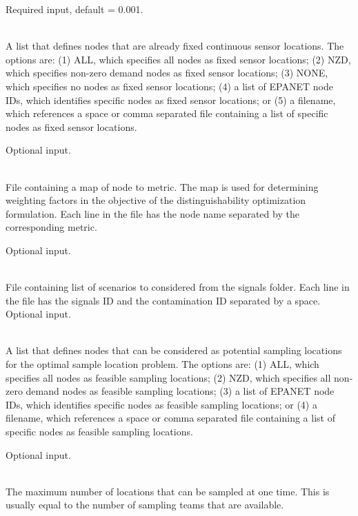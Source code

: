 \begin{description}[topsep=0pt,parsep=0.5em,itemsep=-0.4em]
\begin{description}[topsep=0pt,parsep=0.5em,itemsep=-0.4em]
                Required input, default = 0.001.
    \item[{fixed sensors}]\hfill
\\A list that defines nodes that are already fixed continuous sensor locations.
                The options are: (1) ALL, which specifies all nodes as fixed sensor locations;
                (2) NZD, which specifies non-zero demand nodes as fixed sensor locations;
                (3) NONE, which specifies no nodes as fixed sensor locations;
                (4) a list of EPANET node IDs, which identifies specific nodes as fixed sensor locations; or
                (5) a filename, which references a space or comma separated file containing a list of 
                specific nodes as fixed sensor locations. 

                Optional input.
    \item[{nodes metric}]\hfill
\\ File containing a map of node to metric. The map is used for determining weighting factors
                in the objective of the distinguishability optimization formulation.
                Each line in the file has the node name separated by the corresponding metric.  

                Optional input.
    \item[{list scenario ids}]\hfill
\\ File containing list of scenarios to considered from the signals folder.
                Each line in the file has the signals ID and the contamination ID separated by a space.
                Optional input.
    \item[{feasible nodes}]\hfill
\\A list that defines nodes that can be considered as potential sampling locations 
                for the optimal sample location problem.
                The options are: (1) ALL, which specifies all nodes as feasible sampling locations;
                (2) NZD, which specifies all non-zero demand nodes as feasible sampling locations;
                (3) a list of EPANET node IDs, which identifies specific nodes as feasible sampling locations; or
                (4) a filename, which references a space or comma separated file containing a list of 
                specific nodes as feasible sampling locations. 

                Optional input.
    \item[{num samples}]\hfill
\\The maximum number of locations that can be sampled at one time. This is usually equal
                to the number of sampling teams that are available.


\end{description}
\end{description}
